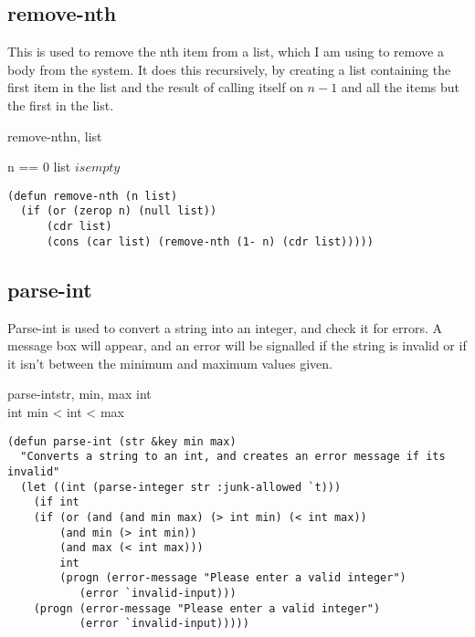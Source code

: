 \subsection{remove-nth}
This is used to remove the nth item from a list, which I am using to remove a
body from the system. It does this recursively, by creating a list containing
the first item in the list and the result of calling itself on $n - 1$ and all
the items but the first in the list.\\

\begin{pseudocode}{remove-nth}{n, list}
	\ENDPROCEDURE

	\ENDPROCEDURE

	\ENDPROCEDURE

	\MAIN
	\IF n == 0 \OR list $ is empty$ 
	\THEN {} 
	\ELSE
	\ENDMAIN
\end{pseudocode}
\begin{lstlisting}
(defun remove-nth (n list)
  (if (or (zerop n) (null list))
      (cdr list)
      (cons (car list) (remove-nth (1- n) (cdr list)))))
\end{lstlisting}

\subsection{parse-int}
Parse-int is used to convert a string into an integer, and check it for errors.
A message box will appear, and an error will be signalled if the string is
invalid or if it isn't between the minimum and maximum values given.

\begin{pseudocode}{parse-int}{str, min, max}
	int \GETS {}  \\
	\IF int 
	\THEN \BEGIN \IF min < int < max 
		\THEN {} 
		\ELSE {} \END
	\ELSE {} 
\end{pseudocode}

\begin{lstlisting}
(defun parse-int (str &key min max)
  "Converts a string to an int, and creates an error message if its invalid"
  (let ((int (parse-integer str :junk-allowed `t)))
    (if int
	(if (or (and (and min max) (> int min) (< int max))
		(and min (> int min))
		(and max (< int max)))
	    int
	    (progn (error-message "Please enter a valid integer")
		   (error `invalid-input)))
	(progn (error-message "Please enter a valid integer")
	       (error `invalid-input)))))
\end{lstlisting}

